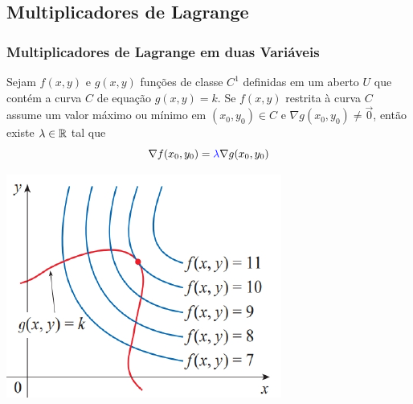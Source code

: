 \subsection*{Multiplicadores de Lagrange}
\begin{frame}[label=otimizacao]
\frametitle{Multiplicadores de Lagrange  em duas Variáveis}


\begin{teo}Sejam $f(x,y)$ e $g(x,y)$ funções de classe $C^1$ definidas em um aberto $U$ que contém a curva $C$ de equação $g(x,y)=k$. Se $f(x,y)$ restrita à curva $C$ assume um valor máximo ou mínimo em $(x_0,y_0)\in C$ e {\color{red}$\nabla g(x_0,y_0)\neq \vec{0}$}, então existe {\color{blue}$\lambda\in \mathbb{R}$ }tal que
\[\nabla f(x_0,y_0)={\color{blue}\lambda} \nabla g(x_0,y_0)\]
\end{teo} 

\begin{center}
\includegraphics[scale=.5]{figuras/sec14_8-fig1.png}
\end{center}


\end{frame}


